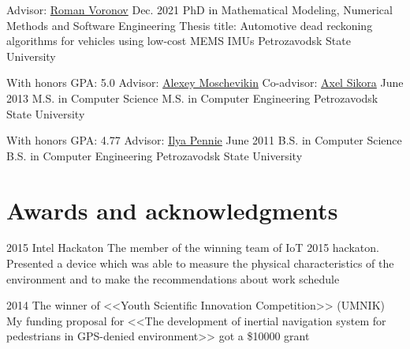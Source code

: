 \documentclass{tccv}
\begin{document}
\begin{eventlist}
\begin{yearlist}

\item[Advisor: \href{https://petrsu.ru/persons/322/voronov}{Roman Voronov}]{Dec. 2021}
     {PhD \textnormal{in Mathematical Modeling, Numerical Methods and Software Engineering} \newline Thesis title: \textnormal{Automotive dead reckoning algorithms for vehicles using low-cost MEMS IMUs}}
     {Petrozavodsk State University}
     

\item[With honors \newline GPA: 5.0 \newline
      Advisor: \href{http://lab127.karelia.ru/~alexmou/resume_alexmou_eng.pdf}{Alexey Moschevikin} \newline
      Co-advisor: \href{https://ei.hs-offenburg.de/nc/ansprechpartner/personen-details-lsf-cache/lsf/704/6/1127/} {Axel Sikora}]{June 2013}
     {M.S. in Computer Science 
      \newline 
      M.S. in Computer Engineering}
     {Petrozavodsk State University}
\end{yearlist}
\begin{yearlist}
\item[With honors \newline GPA: 4.77 \newline
      Advisor: \href{http://openbudgetrf.ru/sotrudnik-publications/4/}{Ilya Pennie}]{June 2011}
     {B.S. in Computer Science 
      \newline 
      B.S. in Computer Engineering}
     {Petrozavodsk State University}

\end{yearlist}

\section{Awards and acknowledgments}

\begin{yearlist}
\item {2015}
     {Intel Hackaton}
     {The member of the winning team of IoT
2015 hackaton. Presented a device which was able to measure the physical characteristics of the environment and to make the recommendations about work schedule}

\item{2014}
     {The winner of <<Youth Scientific Innovation
Competition>> (UMNIK)}
     {My funding proposal for <<The
development of inertial navigation system for pedestrians
in GPS-denied environment>> got a \$10000 grant}


\end{yearlist}
\end{eventlist}
\end{document}
